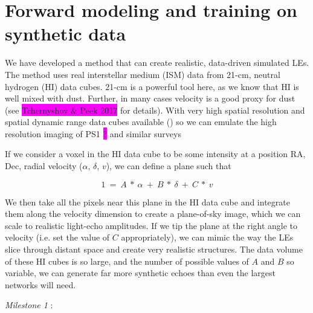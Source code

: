 \documentclass{proposalnsf}
\newcommand{\changeit}[1]{\colorbox{magenta}{#1}}
\begin{document}
\section{Forward modeling and training on synthetic data}\label{sec:fwm}


We have developed a method that can create realistic, data-driven simulated LEs.  The method uses real interstellar medium (ISM) data from 21-cm, neutral hydrogen (HI) data cubes.  21-cm is a powerful tool here, as we know that HI is well mixed with dust.  Further, in many cases velocity is a good proxy for dust (see \changeit{Tchernyshov \& Peek 2017} for details).  With very high spatial resolution and spatial dynamic range data cubes available () so we can emulate the high resolution imaging of PS1 \changeit{?} and similar surveys

If we consider a voxel in the HI data cube to be some intensity at a position RA, Dec, radial velocity ($\alpha$, $\delta$, $v$), we can define a plane such that 

$$1~=~A~*~\alpha~+~B~*~\delta~+~C~*~v$$

We then take all the pixels near this plane in the HI data cube and integrate them along the velocity dimension to create a plane-of-sky image, which we can scale to realistic light-echo amplitudes.  If we tip the plane at the right angle to velocity (i.e.  set the value of $C$ appropriately), we can mimic the way the LEs slice through distant space and create very realistic structures.  The data volume of these HI cubes is so large, and the number of possible values of $A$ and $B$ so variable, we can generate far more synthetic echoes than even the largest networks will need.  

\emph{Milestone 1} :
\end{document}

